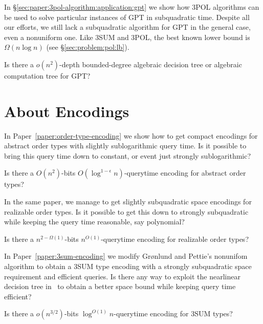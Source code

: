 In \S\ref{sec:paper:3pol-algorithm:application:gpt} we show how 3POL algorithms
can be used to solve particular instances of GPT in subquadratic time.
Despite all our efforts, we still lack a subquadratic algorithm for GPT in the
general case, even a
nonuniform one. Like 3SUM and 3POL, the best known lower bound is \(\Omega(n
\log n)\) (see \S\ref{sec:problem:pol:lb}).
\begin{openquestion}
	Is there a \(o(n^2)\)-depth bounded-degree algebraic decision tree or
	algebraic computation tree for GPT?
\end{openquestion}


\section{About Encodings}

In Paper~\ref{paper:order-type-encoding}
we show how to get compact encodings for abstract order types with slightly
sublogarithmic query time. Is it possible to bring this query time down to
constant, or event just strongly sublogarithmic?
%
\begin{openquestion}
	Is there a \(O(n^2)\)-bits \(O(\log^{1-\epsilon} n )\)-querytime encoding for
	abstract order types?
\end{openquestion}

In the same paper,
we manage to get slightly subquadratic space encodings for realizable order
types. Is it possible to get this down to strongly subquadratic while keeping
the query time reasonable, say polynomial?
%
\begin{openquestion}
	Is there a \(n^{2-\Omega(1)}\)-bits \(n^{O(1)}\)-querytime encoding for
	realizable order types?
\end{openquestion}

In Paper~\ref{paper:3sum-encoding}
we modify Gr\o nlund and Pettie's nonunifom algorithm to obtain a 3SUM type
encoding with a strongly subquadratic space requirement and efficient queries.
Is there any way to exploit the nearlinear decision tree in~\cite{KLM18} to
obtain a better space bound while keeping query time efficient?
\begin{openquestion}
	Is there a \(o(n^{3/2})\)-bits \(\log^{O(1)} n\)-querytime encoding for
	3SUM types?
\end{openquestion}
